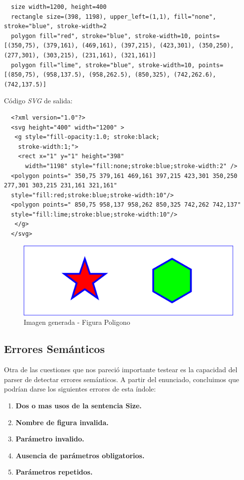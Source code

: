\begin{lstlisting}
  size width=1200, height=400
  rectangle size=(398, 1198), upper_left=(1,1), fill="none", stroke="blue", stroke-width=2
  polygon fill="red", stroke="blue", stroke-width=10, points=[(350,75), (379,161), (469,161), (397,215), (423,301), (350,250), (277,301), (303,215), (231,161), (321,161)]
  polygon fill="lime", stroke="blue", stroke-width=10, points=[(850,75), (958,137.5), (958,262.5), (850,325), (742,262.6), (742,137.5)]
\end{lstlisting}

Código \textit{SVG} de salida:

\begin{lstlisting}
  <?xml version="1.0"?>
  <svg height="400" width="1200" >
   <g style="fill-opacity:1.0; stroke:black;
    stroke-width:1;">
    <rect x="1" y="1" height="398"
      width="1198" style="fill:none;stroke:blue;stroke-width:2" />
  <polygon points=" 350,75 379,161 469,161 397,215 423,301 350,250 277,301 303,215 231,161 321,161"
  style="fill:red;stroke:blue;stroke-width:10"/>
  <polygon points=" 850,75 958,137 958,262 850,325 742,262 742,137"
  style="fill:lime;stroke:blue;stroke-width:10"/>
   </g>
  </svg>
\end{lstlisting}


\begin{figure}[H]
\centering
\includegraphics[width=150mm]{imagenes/polygon.jpg}
\caption{Imagen generada - Figura Poligono}
\end{figure}

\newpage

\subsection{Errores Semánticos}
Otra de las cuestiones que nos pareció importante testear es la capacidad del parser de detectar errores semánticos. A partir del enunciado, concluimos que podrían darse los siguientes errores de esta índole:
\begin{enumerate}
  \item \textbf{Dos o mas usos de la sentencia Size.}
  \item \textbf{Nombre de figura invalida.}
  \item \textbf{Parámetro invalido.}
  \item \textbf{Ausencia de parámetros obligatorios.}
  \item \textbf{Parámetros repetidos.}
\end{enumerate}

